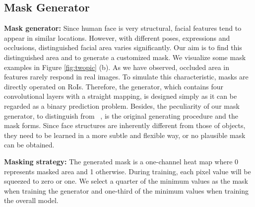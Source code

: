 \documentclass[10pt,twocolumn,letterpaper]{article}
\begin{document}
\begin{figure*}[t]
\centering     
{}
\caption{\textbf{(a)} Heat map of the features from conv5\_3 extracted from Faster RCNN. Occluded areas have less information in the features (the black areas). \textbf{(b)} The compact constraint has made the generated masks more accurate and efficient. A quarter of the minimum values is selected as the mask and is marked black. The masks are operated directly on the 7 by 7 RoIs. We map these masks to their corresponding receptive fields in the original image space for a better visualization. }
\label{fig:twopic}
\end{figure*}

\subsection{Mask Generator}
 \textbf{Mask generator:} Since human face is very structural, facial features tend to appear in similar locations. However, with different poses, expressions and occlusions, distinguished facial area varies significantly. Our aim is to find this distinguished area and to generate a customized mask. We visualize some mask examples in Figure \ref{fig:twopic} (b). As we have observed, occluded area in features rarely respond in real images. To simulate this characteristic, masks are directly operated on RoIs. Therefore, the generator, which contains four convolutional layers with a straight mapping, is designed simply as it can be regarded as a binary prediction problem. Besides, the peculiarity of our mask generator, to distinguish from ~\cite{wang2017fast}, is the original generating procedure and the mask forms. Since face structures are inherently different from those of objects, they need to be learned in a more subtle and flexible way, or no plausible mask can be obtained.
 

 
 





 \textbf{Masking strategy:} The generated mask is a one-channel heat map where 0 represents masked area and 1 otherwise. During training, each pixel value will be squeezed to zero or one. We select a quarter of the minimum values as the mask when training the generator and one-third of the minimum values when training the overall model. 
\end{document}
